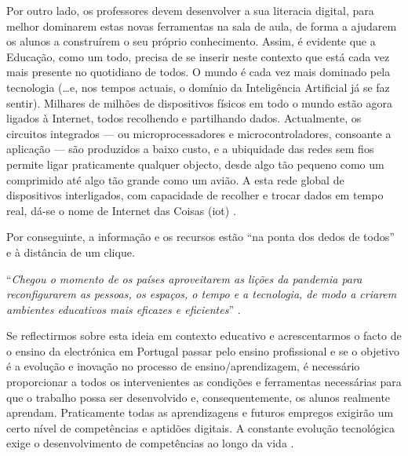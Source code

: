 Por outro lado, os professores devem desenvolver a sua literacia digital, para melhor dominarem estas novas ferramentas na sala de aula, de forma a ajudarem os alunos a construírem o seu próprio conhecimento. Assim, é evidente que a Educação, como um todo, precisa de se inserir neste contexto que está cada vez mais presente no quotidiano de todos. O mundo é cada vez mais dominado pela tecnologia (\ldots e, nos tempos actuais, o domínio da Inteligência Artificial já se faz sentir). Milhares de milhões de dispositivos físicos em todo o mundo estão agora ligados à Internet, todos recolhendo e partilhando dados. Actualmente, os circuitos integrados — ou microprocessadores e microcontroladores, consoante a aplicação — são produzidos a baixo custo, e a ubiquidade das redes sem fios permite ligar praticamente qualquer objecto, desde algo tão pequeno como um comprimido até algo tão grande como um avião. A esta rede global de dispositivos interligados, com capacidade de recolher e trocar dados em tempo real, dá-se o nome de Internet das Coisas (\acrfull{iot}) \cite{IoT}.

Por conseguinte, a informação e os recursos estão “na ponta dos dedos de todos” e à distância de um clique.

\begin{center}
    ``\textit{Chegou o momento de os países aproveitarem as lições da pandemia para reconfigurarem as pessoas, os espaços, o tempo e a tecnologia, de modo a criarem ambientes educativos mais eficazes e eficientes}'' \cite{thestateofeducation}.
\end{center}

Se reflectirmos sobre esta ideia em contexto educativo e acrescentarmos o facto de o ensino da electrónica em Portugal passar pelo ensino profissional e se o objetivo é a evolução e inovação no processo de ensino/aprendizagem, é necessário proporcionar a todos os intervenientes as condições e ferramentas necessárias para que o trabalho possa ser desenvolvido e, consequentemente, os alunos realmente aprendam. Praticamente todas as aprendizagens e futuros empregos exigirão um certo nível de competências e aptidões digitais. A constante evolução tecnológica exige o desenvolvimento de competências ao longo da vida \cite{Digitale13:online}.


